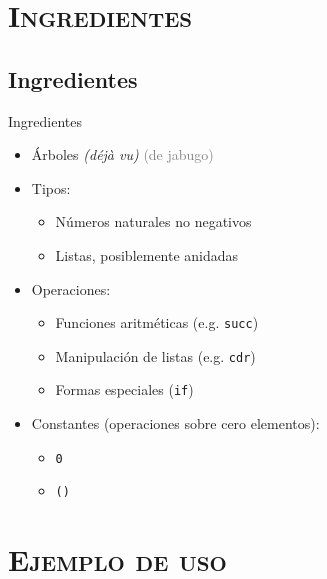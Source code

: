 \documentclass[xcolor=x11names,compress]{beamer}
\renewcommand{\(}{\begin{columns}}
\renewcommand{\)}{\end{columns}}
\newcommand{\<}[1]{\begin{column}{#1}}
\renewcommand{\>}{\end{column}}
\begin{document}
\section{\scshape Ingredientes}
\subsection{Ingredientes}
\begin{frame}{Ingredientes}
    \begin{itemize}
        \item Árboles \pause \emph{(déjà vu)} \pause \textcolor{gray}{\scriptsize(de jabugo)} \pause
        \item Tipos: \pause
            \begin{itemize}
            \item Números naturales no negativos \pause
            \item Listas, posiblemente anidadas \pause
            \end{itemize}
        \item Operaciones: \pause
            \begin{itemize}
                \item Funciones aritméticas (e.g. \texttt{succ}) \pause
                \item Manipulación de listas (e.g. \texttt{cdr}) \pause
                \item Formas especiales (\texttt{if}) \pause
            \end{itemize}
        \item Constantes (operaciones sobre cero elementos): \pause
            \begin{itemize}
                \item \texttt{0} \pause
                \item \texttt{()}
            \end{itemize}
    \end{itemize}
\end{frame}

\section{\scshape Ejemplo de uso}
\end{document}
